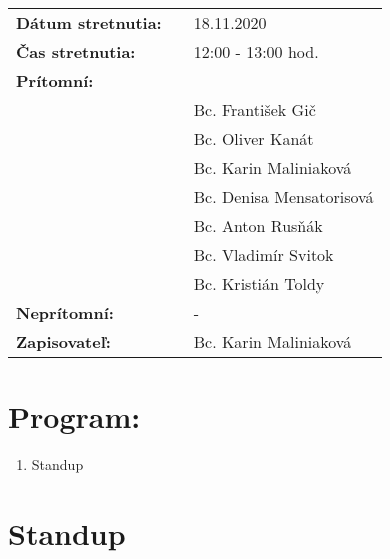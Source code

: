 \documentclass{article}
\begin{document}
    

    \begin{table}[h]
        \begin{tabular}{lllll}
            \multicolumn{3}{l}{\textbf{Dátum stretnutia:}} & & 18.11.2020 \\
            \multicolumn{3}{l}{\textbf{Čas stretnutia:}} & & 12:00 - 13:00 hod. \\
            \multicolumn{3}{l}{\textbf{Prítomní:}} \\
            & & & & Bc. František Gič  \\
            & & & & Bc. Oliver Kanát \\
            & & & & Bc. Karin Maliniaková \\
            & & & & Bc. Denisa Mensatorisová \\
            & & & & Bc. Anton Rusňák \\
            & & & & Bc. Vladimír Svitok \\
            & & & & Bc. Kristián Toldy \\
            \multicolumn{3}{l}{\textbf{Neprítomní:}} & & -\\
            \multicolumn{3}{l}{\textbf{Zapisovateľ:}} & & Bc. Karin Maliniaková \\
        \end{tabular}
        \label{tab:grades}
    \end{table}

    \section*{Program:}

    \begin{enumerate}
        \item Standup
    \end{enumerate}

    \section*{Standup}
\end{document}
